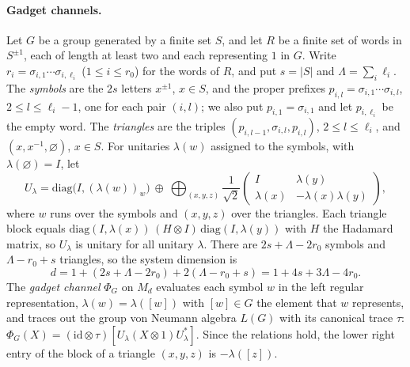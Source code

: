\paragraph{Gadget channels.} Let $G$ be a group generated by a finite set $S$, and let $R$ be a finite set of words in $S^{\pm1}$, each of length at
least two and each representing $1$ in $G$. Write $r_i=\sigma_{i,1}\cdots\sigma_{i,\ell_i}$ ($1\le i\le r_0$) for the words of $R$, and put
$s=|S|$ and $\Lambda=\sum_i\ell_i$. The \emph{symbols} are the $2s$ letters $x^{\pm1}$, $x\in S$, and the proper prefixes
$p_{i,l}=\sigma_{i,1}\cdots\sigma_{i,l}$, $2\le l\le\ell_i-1$, one for each pair $(i,l)$; we also put $p_{i,1}=\sigma_{i,1}$ and let $p_{i,\ell_i}$
be the empty word. The \emph{triangles} are the triples $(p_{i,l-1},\sigma_{i,l},p_{i,l})$, $2\le l\le\ell_i$, and $(x,x^{-1},\varnothing)$,
$x\in S$. For unitaries $\lambda(w)$ assigned to the symbols, with $\lambda(\varnothing)=I$, let
\[
U_\lambda=\mathrm{diag}\bigl(I,(\lambda(w))_{w}\bigr)\ \oplus\ \bigoplus_{(x,y,z)}\frac1{\sqrt2}\begin{pmatrix}I&\lambda(y)\\ \lambda(x)&-\lambda(x)\lambda(y)\end{pmatrix},
\]
where $w$ runs over the symbols and $(x,y,z)$ over the triangles. Each triangle block equals $\mathrm{diag}(I,\lambda(x))\,(H\otimes I)\,\mathrm{diag}(I,\lambda(y))$
with $H$ the Hadamard matrix, so $U_\lambda$ is unitary for all unitary $\lambda$. There are $2s+\Lambda-2r_0$ symbols and $\Lambda-r_0+s$
triangles, so the system dimension is
\begin{equation}\label{eq:gadget-dimension}
d=1+(2s+\Lambda-2r_0)+2(\Lambda-r_0+s)=1+4s+3\Lambda-4r_0 .
\end{equation}
The \emph{gadget channel} $\Phi_G$ on $M_d$ evaluates each symbol $w$ in the left regular representation, $\lambda(w)=\lambda([w])$ with $[w]\in G$ the
element that $w$ represents, and traces out the group von Neumann algebra $L(G)$ with its canonical trace $\tau$:
$\Phi_G(X)=(\mathrm{id}\otimes\tau)[U_\lambda(X\otimes1)U_\lambda^*]$. Since the relations hold, the lower right entry of the block of a triangle
$(x,y,z)$ is $-\lambda([z])$.

